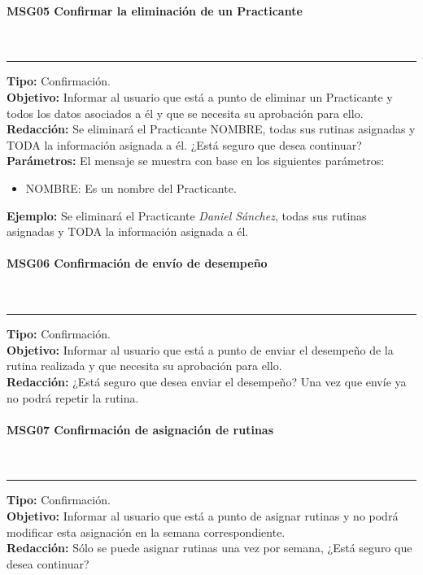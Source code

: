 \paragraph{\textcolor[rgb]{0, 0, 0.545098}{MSG05 Confirmar la eliminación de un Practicante}} \hspace{1cm} \\
\label{msj:MSG05}
\rule[3mm]{16.59cm}{0.1mm} \vspace{1mm}
\textbf{Tipo:} Confirmación.\\
\textbf{Objetivo:} Informar al usuario que está a punto de eliminar un Practicante y todos los datos asociados a él y que se necesita su aprobación para ello.\\
\textbf{Redacción:} Se eliminará el Practicante NOMBRE, todas sus rutinas asignadas y TODA la información asignada a él. ¿Está seguro que desea continuar?\\
\textbf{Parámetros:} El mensaje se muestra con base en los siguientes parámetros:
\begin{itemize} \itemsep1pt \parskip0pt 
	\item NOMBRE: Es un nombre del Practicante.
\end{itemize}
\textbf{Ejemplo:} Se eliminará el Practicante \textit{Daniel Sánchez}, todas sus rutinas asignadas y TODA la información asignada a él.\\

\paragraph{\textcolor[rgb]{0, 0, 0.545098}{MSG06 Confirmación de envío de desempeño}} \hspace{1cm} \\
\label{msj:MSG06}
\rule[3mm]{16.59cm}{0.1mm} \vspace{1mm}
\textbf{Tipo:} Confirmación.\\
\textbf{Objetivo:} Informar al usuario que está a punto de enviar el desempeño de la rutina realizada y que necesita su aprobación para ello.\\
\textbf{Redacción:} ¿Está seguro que desea enviar el desempeño? Una vez que envíe ya no podrá repetir la rutina.\\

\paragraph{\textcolor[rgb]{0, 0, 0.545098}{MSG07 Confirmación de asignación de rutinas}} \hspace{1cm} \\
\label{msj:MSG07}
\rule[3mm]{16.59cm}{0.1mm} \vspace{1mm}
\textbf{Tipo:} Confirmación.\\
\textbf{Objetivo:} Informar al usuario que está a punto de asignar rutinas y no podrá modificar esta asignación en la semana correspondiente.\\
\textbf{Redacción:} Sólo se puede asignar rutinas una vez por semana, ¿Está seguro que desea continuar?\\

